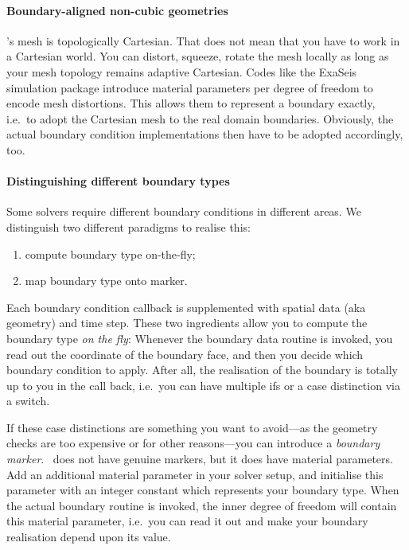 \paragraph{Boundary-aligned non-cubic geometries}
%
%
%
\ExaHyPE's mesh is topologically Cartesian.
That does not mean that you have to work in a Cartesian world.
You can distort, squeeze, rotate the mesh locally as long as your mesh topology
remains adaptive Cartesian.
Codes like the ExaSeis simulation package introduce material parameters per
degree of freedom to encode mesh distortions.
This allows them to represent a boundary exactly, i.e.~to adopt the Cartesian
mesh to the real domain boundaries.
Obviously, the actual boundary condition implementations then have to be adopted
accordingly, too.


\paragraph{Distinguishing different boundary types}
%
%
%
Some solvers require different boundary conditions in different areas. 
We distinguish two different paradigms to realise this:
\begin{enumerate}
  \item compute boundary type on-the-fly;
  \item map boundary type onto marker.
\end{enumerate} 


\noindent
Each boundary condition callback is supplemented with spatial data (aka
geometry) and time step.
These two ingredients allow you to compute the boundary type \emph{on the fly}: 
Whenever the boundary data routine is invoked, you read out the coordinate of
the boundary face, and then you decide which boundary condition to apply.
After all, the realisation of the boundary is totally up to you in the call
back, i.e.~you can have multiple ifs or a case distinction via a switch.


If these case distinctions are something you want to avoid---as the geometry
checks are too expensive or for other reasons---you can introduce a
\emph{boundary marker}.
\ExaHyPE\ does not have genuine markers, but it does have material parameters.
Add an additional material parameter in your solver setup, and initialise this
parameter with an integer constant which represents your boundary type. 
When the actual boundary routine is invoked, the inner degree of freedom will
contain this material parameter, i.e.~you can read it out and make your boundary
realisation depend upon its value.



